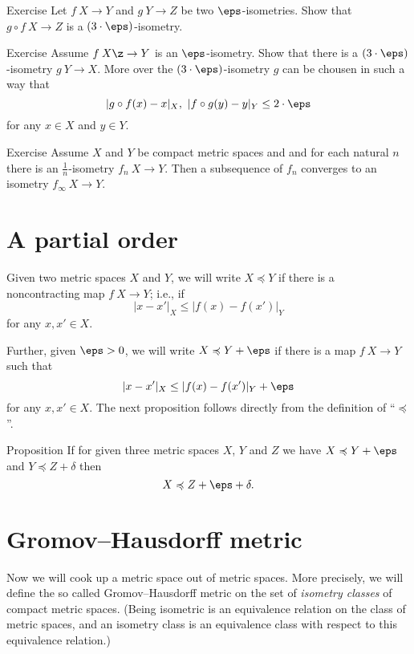 \begin{thm}{Exercise}\label{ex:alm-isom:compositon}
Let $f\:X\to Y$ and $g\:Y\to Z$ be two $\eps$-isometries.
Show that $g\circ f\: X\to Z$ is a $(3\cdot\eps)$-isometry.
\end{thm}


\begin{thm}{Exercise}\label{ex:alm-isom:inverse}
 Assume $f\: X \z\to Y$ is an $\eps$-isometry.
Show that there is a $(3\cdot\eps)$-isometry 
$g\: Y\to X$.
More over the $(3\cdot\eps)$-isometry $g$ can be chousen in such a way that
$$|g\circ f(x)-x|_X,\ |f\circ g(y)-y|_Y\le 2\cdot \eps$$
for any $x\in X$ 
and $y\in Y$.
\end{thm}

\begin{thm}{Exercise}\label{ex:alm-isom-limit}
Assume $X$ and $Y$ be compact metric spaces and
and for each natural $n$ there is an $\tfrac1n$-isometry
$f_n\:X\to Y$.
Then a subsequence of $f_n$ converges to an isometry $f_\infty\:X\to Y$.  
\end{thm}


\section{A partial order}




Given two metric spaces $X$ and $Y$, we will write $X\preccurlyeq Y$ if there is a noncontracting map $f\:X\to Y$;
i.e., if 
$$ |x-x'|_X\le|f(x)-f(x')|_Y$$
for any $x,x'\in X$.

Further, given $\eps>0$, we will write $X\preccurlyeq Y+\eps$
if there is a map $f\:X\to Y$ such that 
$$|x-x'|_X\le|f(x)-f(x')|_Y+\eps$$
for any $x,x'\in X$.
The next proposition follows directly from the definition of ``$\preccurlyeq$''. 

\begin{thm}{Proposition}\label{prop:po-eps}
If for given three metric spaces $X$, $Y$ and $Z$
we have 
$X\preccurlyeq Y+\eps$ and 
$Y\preccurlyeq Z+\delta$ 
then
$$X\preccurlyeq Z+\eps+\delta.$$

\end{thm}


\section{Gromov--Hausdorff metric}

Now we will cook up a metric space out of metric spaces.
More precisely, we will define the so called  Gromov--Hausdorff metric on the set of \emph{isometry classes} of compact metric spaces.
(Being isometric is an equivalence relation on the class of metric spaces, 
and an isometry class is an equivalence class with respect to this equivalence relation.)

